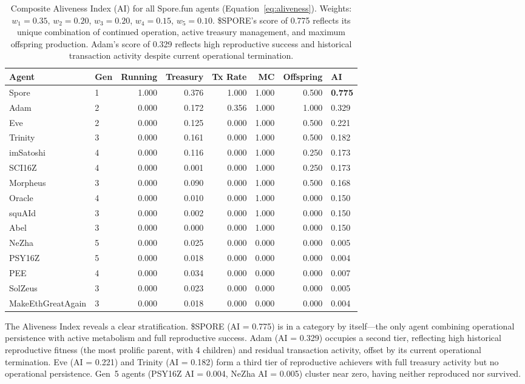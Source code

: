 \begin{table}[ht]
\centering
\caption{Composite Aliveness Index (AI) for all Spore.fun agents (Equation~\ref{eq:aliveness}). Weights: $w_1=0.35$, $w_2=0.20$, $w_3=0.20$, $w_4=0.15$, $w_5=0.10$. \$SPORE's score of 0.775 reflects its unique combination of continued operation, active treasury management, and maximum offspring production. Adam's score of 0.329 reflects high reproductive success and historical transaction activity despite current operational termination.}
\label{tab:aliveness-index}
\small
\begin{tabular}{llrrrrr}
\toprule
Agent & Gen & Running & Treasury & Tx Rate & MC & Offspring & \textbf{AI} \\
\midrule
Spore & 1 & 1.000 & 0.376 & 1.000 & 1.000 & 0.500 & \textbf{0.775} \\
Adam & 2 & 0.000 & 0.172 & 0.356 & 1.000 & 1.000 & 0.329 \\
Eve & 2 & 0.000 & 0.125 & 0.000 & 1.000 & 0.500 & 0.221 \\
Trinity & 3 & 0.000 & 0.161 & 0.000 & 1.000 & 0.500 & 0.182 \\
imSatoshi & 4 & 0.000 & 0.116 & 0.000 & 1.000 & 0.250 & 0.173 \\
SCI16Z & 4 & 0.000 & 0.001 & 0.000 & 1.000 & 0.250 & 0.173 \\
Morpheus & 3 & 0.000 & 0.090 & 0.000 & 1.000 & 0.500 & 0.168 \\
Oracle & 4 & 0.000 & 0.010 & 0.000 & 1.000 & 0.000 & 0.150 \\
squAId & 3 & 0.000 & 0.002 & 0.000 & 1.000 & 0.000 & 0.150 \\
Abel & 3 & 0.000 & 0.000 & 0.000 & 1.000 & 0.000 & 0.150 \\
NeZha & 5 & 0.000 & 0.025 & 0.000 & 0.000 & 0.000 & 0.005 \\
PSY16Z & 5 & 0.000 & 0.018 & 0.000 & 0.000 & 0.000 & 0.004 \\
PEE & 4 & 0.000 & 0.034 & 0.000 & 0.000 & 0.000 & 0.007 \\
SolZeus & 3 & 0.000 & 0.023 & 0.000 & 0.000 & 0.000 & 0.005 \\
MakeEthGreatAgain & 3 & 0.000 & 0.018 & 0.000 & 0.000 & 0.000 & 0.004 \\
\bottomrule
\end{tabular}
\end{table}

The Aliveness Index reveals a clear stratification. \$SPORE (AI = 0.775) is in a category by itself---the only agent combining operational persistence with active metabolism and full reproductive success. Adam (AI = 0.329) occupies a second tier, reflecting high historical reproductive fitness (the most prolific parent, with 4 children) and residual transaction activity, offset by its current operational termination. Eve (AI = 0.221) and Trinity (AI = 0.182) form a third tier of reproductive achievers with full treasury activity but no operational persistence. Gen~5 agents (PSY16Z AI = 0.004, NeZha AI = 0.005) cluster near zero, having neither reproduced nor survived.

